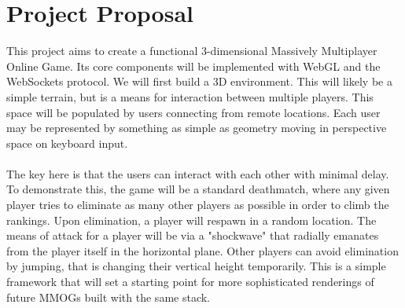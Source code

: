 \documentclass{acmsiggraph}
\begin{document}
\section{Project Proposal}
This project aims to create a functional 3-dimensional Massively Multiplayer Online Game. Its core components will be implemented with WebGL and the WebSockets protocol. We will first build a 3D environment. This will likely be a simple terrain, but is a means for interaction between multiple players. This space will be populated by users connecting from remote locations. Each user may be represented by something as simple as geometry moving in perspective space on keyboard input.
\\\\
The key here is that the users can interact with each other with minimal delay. To demonstrate this, the game will be a standard deathmatch, where any given player tries to eliminate as many other players as possible in order to climb the rankings. Upon elimination, a player will respawn in a random location. The means of attack for a player will be via a "shockwave" that radially emanates from the player itself in the horizontal plane. Other players can avoid elimination by jumping, that is changing their vertical height temporarily. This is a simple framework that will set a starting point for more sophisticated renderings of future MMOGs built with the same stack.
\end{document}
